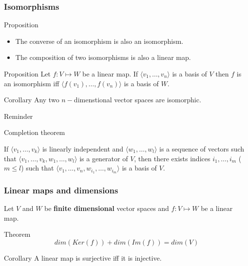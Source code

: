 \documentclass{beamer}
\begin{document}
\begin{frame}
  \frametitle{Isomorphisms}
  \begin{block}{Proposition}
    \begin{itemize}
    \item The converse of an isomorphism is also an isomorphism.
    \item The composition of two isomorphisms is also a linear map.
    \end{itemize}
  \end{block}

  \begin{block}{Proposition}
    Let $f: V \mapsto W$ be a linear map. If $\langle v_1, \dots, v_n \rangle$ is a basis of $V$ then $f$ is an isomorphism iff $\langle f(v_1), \dots, f(v_n) \rangle$ is a basis of $W$.
  \end{block}

  \begin{block}{Corollary}
    Any two $n-$dimenstional vector spaces are isomorphic.
  \end{block}
\end{frame}


\begin{frame}{Reminder}
  \begin{block}{Completion theorem}
    
    If $\langle v_1, \dots, v_k \rangle$ is linearly independent and $\langle w_1, \dots, w_l \rangle$ is a sequence of vectors such that $\langle v_1, \dots, v_k, w_1, \dots, w_l \rangle$ is a generator of $V$, then there exists indices $i_1, \dots, i_m$ ($m \le l$) such that $\langle v_1, \dots, v_n, w_{i_1}, \dots, w_{i_m} \rangle$ is a basis of $V$.
  \end{block}
  
\end{frame}

\begin{frame}
  \frametitle{Linear maps and dimensions}
  Let $V$ and $W$ be {\bf finite dimensional} vector spaces and $f: V \mapsto W$ be a linear map.

  \begin{block}{Theorem}
    \[dim(Ker(f)) + dim(Im(f)) = dim(V)\]
  \end{block}

  \begin{block}{Corollary}
    A linear map is surjective iff it is injective.
  \end{block}
\end{frame}
\end{document}
